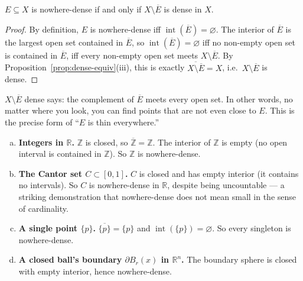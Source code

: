 
\begin{proposition}
\label{prop:nowhere-dense-equiv}
$E \subseteq X$ is nowhere-dense if and only if $X \setminus \overline{E}$
is dense in $X$.
\end{proposition}

\begin{proof}
By definition, $E$ is nowhere-dense iff $\operatorname{int}(\overline{E}) = \varnothing$.
The interior of $\overline{E}$ is the largest open set contained in
$\overline{E}$, so $\operatorname{int}(\overline{E}) = \varnothing$ iff no
non-empty open set is contained in $\overline{E}$, iff every non-empty open
set meets $X \setminus \overline{E}$.
By Proposition~\ref{prop:dense-equiv}(iii), this is exactly
$\overline{X \setminus \overline{E}} = X$, i.e.\ $X \setminus \overline{E}$
is dense.
\end{proof}

\begin{remark*}
$X \setminus \overline{E}$ dense says: the complement of $\overline{E}$
meets every open set.
In other words, no matter where you look, you can find points
that are not even close to $E$.
This is the precise form of ``$E$ is thin everywhere.''
\end{remark*}


\begin{example}
\label{ex:nowhere-dense}
\begin{enumerate}[(a)]
  \item \textbf{Integers in $\mathbb{R}$.}
        $\mathbb{Z}$ is closed, so $\overline{\mathbb{Z}} = \mathbb{Z}$.
        The interior of $\mathbb{Z}$ is empty (no open interval is contained
        in $\mathbb{Z}$). So $\mathbb{Z}$ is nowhere-dense.

  \item \textbf{The Cantor set $C \subset [0,1]$.}
        $C$ is closed and has empty interior (it contains no intervals).
        So $C$ is nowhere-dense in $\mathbb{R}$,
        despite being uncountable --- a striking demonstration that
        nowhere-dense does not mean small in the sense of cardinality.

  \item \textbf{A single point $\{p\}$.}
        $\overline{\{p\}} = \{p\}$ and $\operatorname{int}(\{p\}) = \varnothing$.
        So every singleton is nowhere-dense.

  \item \textbf{A closed ball's boundary $\partial B_r(x)$ in $\mathbb{R}^n$.}
        The boundary sphere is closed with empty interior, hence nowhere-dense.
\end{enumerate}
\end{example}

